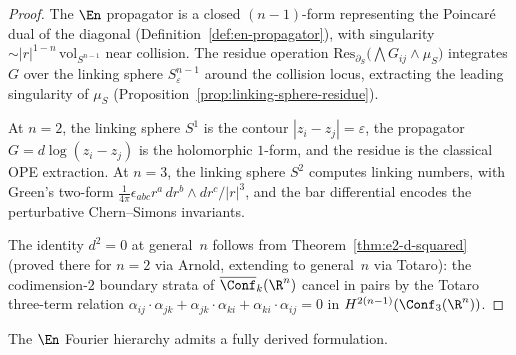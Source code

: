 \begin{proof}
The $\En$ propagator is a closed $(n{-}1)$-form representing the
Poincar\'e dual of the diagonal
(Definition~\ref{def:en-propagator}), with singularity
$\sim |r|^{1-n}\, \mathrm{vol}_{S^{n-1}}$ near collision. The
residue operation
$\mathrm{Res}_{\partial_S}\bigl(\bigwedge G_{ij} \wedge \mu_S\bigr)$
integrates $G$ over the linking sphere
$S^{n-1}_\varepsilon$ around the collision locus, extracting the
leading singularity of $\mu_S$
(Proposition~\ref{prop:linking-sphere-residue}).

At $n = 2$, the linking sphere $S^1$ is the contour
$|z_i - z_j| = \varepsilon$, the propagator
$G = d\log(z_i - z_j)$ is the holomorphic $1$-form, and the
residue is the classical OPE extraction. At $n = 3$, the linking
sphere $S^2$ computes linking numbers, with Green's two-form
$\frac{1}{4\pi}\epsilon_{abc}r^a\,dr^b\wedge dr^c/|r|^3$, and the
bar differential encodes the perturbative Chern--Simons invariants.

The identity $d^2 = 0$ at general~$n$ follows from
Theorem~\ref{thm:e2-d-squared} (proved there for $n = 2$ via
Arnold, extending to general~$n$ via Totaro): the
codimension-$2$ boundary strata of $\overline{\Conf}_k(\R^n)$
cancel in pairs by the Totaro three-term relation
$\alpha_{ij} \cdot \alpha_{jk} + \alpha_{jk} \cdot \alpha_{ki}
+ \alpha_{ki} \cdot \alpha_{ij} = 0$ in
$H^{2(n-1)}(\Conf_3(\R^n))$.
\end{proof}

The $\En$ Fourier hierarchy admits a fully derived formulation.

